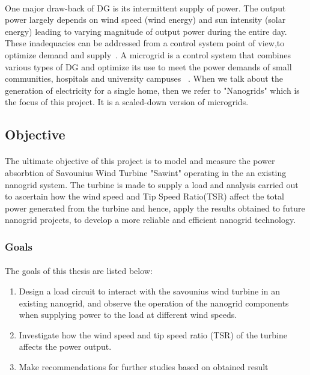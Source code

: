 \documentclass[titlepage]{article}
\begin{document}
\paragraph{} One major draw-back of DG is its intermittent supply of power. The output power largely depends on wind speed (wind energy) and sun intensity (solar energy) leading to varying magnitude of output power during the entire day. These inadequacies can be addressed from a control system point of view,to optimize demand and supply~\cite{AghaeiJ}. A microgrid is a control system that combines various types of DG and optimize its use to meet the power demands of small communities, hospitals and university campuses ~\cite{PlanasE}. When we talk about the generation of electricity for a single home, then we refer to "Nanogrids" which is the focus of this project. It is a scaled-down version of microgrids. 

\subsection{Objective}
\paragraph{} The ultimate objective of this project is to model and measure the power absorbtion of Savounius Wind Turbine "Sawint" operating in the an existing nanogrid system. The turbine is made to supply a load and analysis carried out to ascertain how the wind speed and Tip Speed Ratio(TSR) affect the total power generated from the turbine and hence, apply the results obtained to future nanogrid projects, to develop a more reliable and efficient nanogrid technology.

\subsubsection{Goals}
\paragraph{} The goals of this thesis are listed below:
\begin{enumerate}
    \item Design a load circuit to interact with the savounius wind turbine in an existing nanogrid, and observe the operation of the nanogrid components when supplying power to the load at different wind speeds.
    \item Investigate how the wind speed and tip speed ratio (TSR) of the turbine affects the power output.
    \item Make recommendations for further studies based on obtained result 
\end{enumerate}
\end{document}
